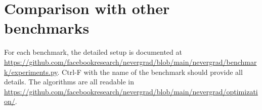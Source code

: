\documentclass{article}
\begin{document}
\section{Comparison with other benchmarks}
%      
For each benchmark, the detailed setup is documented at \url{https://github.com/facebookresearch/nevergrad/blob/main/nevergrad/benchmark/experiments.py}.
Ctrl-F with the name of the benchmark should provide all details.
The algorithms are all readable in  \url{https://github.com/facebookresearch/nevergrad/blob/main/nevergrad/optimization/}.
\end{document}
